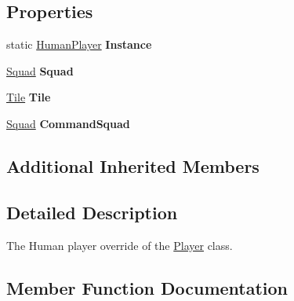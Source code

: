\subsection*{Properties}
\begin{DoxyCompactItemize}
\item 
\hypertarget{class_human_player_afe2424650b1d64c8c517893065d38bc9}{}static \hyperlink{class_human_player}{Human\+Player} {\bfseries Instance}\label{class_human_player_afe2424650b1d64c8c517893065d38bc9}

\item 
\hypertarget{class_human_player_acd254b203d3e89105c795ea3ccabeb3b}{}\hyperlink{class_squad}{Squad} {\bfseries Squad}\label{class_human_player_acd254b203d3e89105c795ea3ccabeb3b}

\item 
\hypertarget{class_human_player_a4fd6f82206954dbafa941934e71e7e30}{}\hyperlink{class_tile}{Tile} {\bfseries Tile}\label{class_human_player_a4fd6f82206954dbafa941934e71e7e30}

\item 
\hypertarget{class_human_player_a6f631e6086f5790a2acfb05c7c15e7f5}{}\hyperlink{class_squad}{Squad} {\bfseries Command\+Squad}\label{class_human_player_a6f631e6086f5790a2acfb05c7c15e7f5}

\end{DoxyCompactItemize}
\subsection*{Additional Inherited Members}


\subsection{Detailed Description}
The Human player override of the \hyperlink{class_player}{Player} class. 



\subsection{Member Function Documentation}
\hypertarget{class_human_player_acec8f5e48d38f90059506d8551c63238}{}
